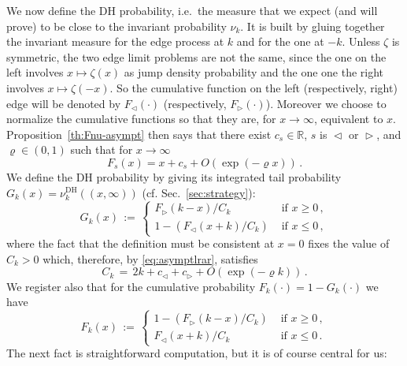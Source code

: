 \documentclass[reqno,11pt]{amsart}
\numberwithin{equation}{section}
\newcommand{\bbR}{{\ensuremath{\mathbb R}} }
\newcommand{\gz}{\zeta}
\newcommand{\lar}{\vartriangleleft}
\newcommand{\rar}{\vartriangleright}
\begin{document}
We now  define the DH probability, i.e.\ the measure that we expect (and  will prove)  to be close to  the invariant probability $\nu_k$. %
It is built by gluing together the invariant measure for the edge process at $k$ and for the one at $-k$.  
Unless $\gz$ is symmetric, the two edge limit problems are not the same, since the one on the left involves 
$x \mapsto\gz(x)$ as jump density probability and the one one the right involves $x \mapsto\gz(-x)$. So the cumulative function on the left (respectively, right) edge will be denoted by $F_\lar(\cdot)$ (respectively,
$F_\rar(\cdot)$). Moreover we choose to normalize the cumulative functions so that they are, for $x \to \infty$, equivalent to $x$.
Proposition~\ref{th:Fnu-asympt}  then says that there exist $c_s\in \bbR$, $s$ is $\lar$ or $\rar$, and  $\varrho\in (0,1)$ such that for $x \to \infty$
\begin{equation}
\label{eq:asymptlrar}
F_s(x)= x+ c_s + O\left(\exp(-\varrho x)\right)\, .
\end{equation}
We define the DH probability by giving its 
  integrated tail probability $G_k(x)= \nu^{\textrm{DH}}_k((x, \infty))$ (cf. Sec.~\ref{sec:strategy}):
\begin{equation}
G_k(x)\, :=\, \begin{cases} 
F_{\rar}(k-x) / C_k  & \text{ if } x \ge 0\, ,
\\
1- \left(F_\lar(x+k)/C_k\right) & \text{ if } x \le 0\, ,
\end{cases}
\end{equation}
where the fact that the definition  must be consistent at $x=0$ 
fixes the value of $C_k>0$ which, therefore, by \eqref{eq:asymptlrar}, satisfies
\begin{equation}
\label{eq:Ck}
C_k\, =\, 2k +c_\lar +c_\rar + O(\exp(-\varrho k))\,.
\end{equation}  
We register also that for the cumulative probability  $F_k(\cdot)=1-G_k(\cdot)$ we have
\begin{equation}
\label{eq:cumFk}
F_k(x)\, :=\, \begin{cases} 
1-\left(F_{\rar}(k-x) / C_k\right)  & \text{ if } x \ge 0\, ,
\\
F_\lar(x+k)/C_k & \text{ if } x \le 0\, .
\end{cases}
\end{equation}
The next fact is straightforward  computation, but it is of course central   for us:

\medskip
\end{document}
